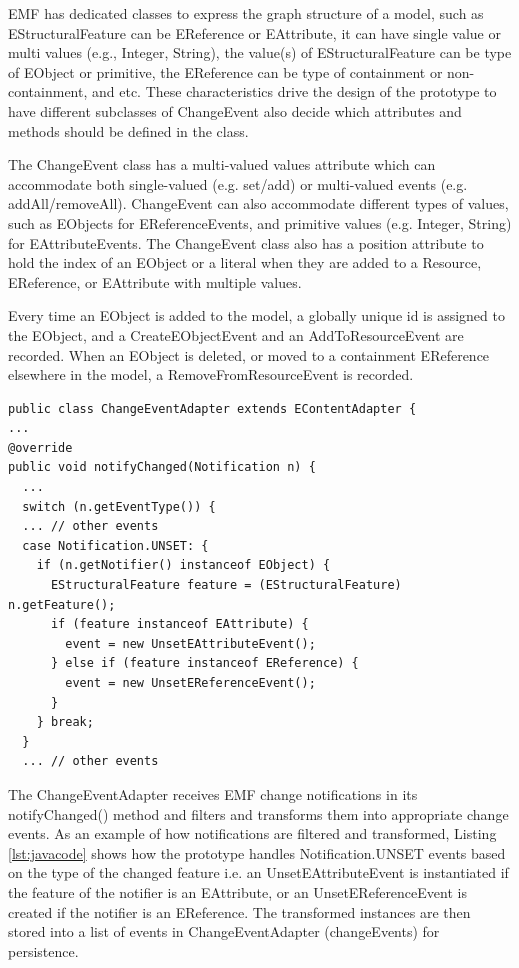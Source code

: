 EMF has dedicated classes to express the graph structure of a model, such as \textsf{EStructuralFeature} can be \textsf{EReference} or \textsf{EAttribute}, it can have single value or multi values (e.g., Integer, String), the value(s) of \textsf{EStructuralFeature} can be type of \textsf{EObject} or primitive, the \textsf{EReference} can be type of containment or non-containment, and etc. These characteristics drive the design of the prototype to have different subclasses of \textsf{ChangeEvent} also decide which attributes and methods should be defined in the class. 

The \textsf{ChangeEvent} class has a multi-valued \textsf{values} attribute which can accommodate both single-valued (e.g. set/add) or multi-valued events (e.g. addAll/removeAll). \textsf{ChangeEvent} can also accommodate different types of values, such as \textsf{EObject}s for \textsf{EReferenceEvents}, and primitive values (e.g. Integer, String) for \textsf{EAttributeEvents}. The \textsf{ChangeEvent} class also has a position attribute to hold the  index of an \textsf{EObject} or a literal when they are added to a \textsf{Resource}, \textsf{EReference}, or \textsf{EAttribute} with multiple values. 

Every time an \textsf{EObject} is added to the model, a globally unique id is assigned to the \textsf{EObject}, and a \textsf{CreateEObjectEvent} and an \textsf{AddToResourceEvent} are recorded. When an EObject is deleted, or moved to a containment \textsf{EReference} elsewhere in the model, a \textsf{RemoveFromResourceEvent}
is recorded.

\begin{lstlisting}[style=java,caption={Simplified Java code to handle notification events.},label=lst:javacode]
public class ChangeEventAdapter extends EContentAdapter {
...
@override
public void notifyChanged(Notification n) {
  ...
  switch (n.getEventType()) {
  ... // other events
  case Notification.UNSET: {
    if (n.getNotifier() instanceof EObject) {
      EStructuralFeature feature = (EStructuralFeature) n.getFeature();
      if (feature instanceof EAttribute) {
        event = new UnsetEAttributeEvent();
      } else if (feature instanceof EReference) {
        event = new UnsetEReferenceEvent();
      }
    } break;
  } 
  ... // other events
\end{lstlisting}	

The \textsf{ChangeEventAdapter} receives EMF change notifications in its \textsf{notifyChanged()} method and filters and transforms them into appropriate change events. As an example of how notifications are filtered and transformed, Listing \ref{lst:javacode} shows how the prototype handles \textsf{Notification.UNSET} events based on the type of the changed feature i.e. an \textsf{UnsetEAttributeEvent} is instantiated if the feature of the notifier is an \textsf{EAttribute}, or an \textsf{UnsetEReferenceEvent}  is created if the notifier is an \textsf{EReference}. The transformed instances are then stored into a list of events in \textsf{ChangeEventAdapter} (\textsf{changeEvents}) for persistence. 

